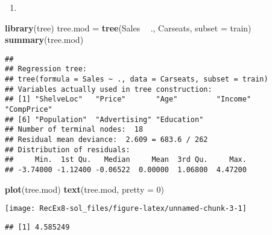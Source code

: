 \documentclass[]{article}
\newenvironment{Shaded}{\begin{snugshade}}{\end{snugshade}}
\newcommand{\DataTypeTok}[1]{\textcolor[rgb]{0.13,0.29,0.53}{#1}}
\newcommand{\DecValTok}[1]{\textcolor[rgb]{0.00,0.00,0.81}{#1}}
\newcommand{\KeywordTok}[1]{\textcolor[rgb]{0.13,0.29,0.53}{\textbf{#1}}}
\newcommand{\NormalTok}[1]{#1}
\newcommand{\OperatorTok}[1]{\textcolor[rgb]{0.81,0.36,0.00}{\textbf{#1}}}
\newcommand{\StringTok}[1]{\textcolor[rgb]{0.31,0.60,0.02}{#1}}
\begin{document}
\begin{enumerate}
\def\labelenumi{\alph{enumi})}
\setcounter{enumi}{1}
\item
\end{enumerate}

\begin{Shaded}
\begin{Highlighting}[]
\KeywordTok{library}\NormalTok{(tree)}
\NormalTok{tree.mod =}\StringTok{ }\KeywordTok{tree}\NormalTok{(Sales }\OperatorTok{~}\StringTok{ }\NormalTok{., Carseats, }\DataTypeTok{subset =}\NormalTok{ train)}
\KeywordTok{summary}\NormalTok{(tree.mod)}
\end{Highlighting}
\end{Shaded}

\begin{verbatim}
## 
## Regression tree:
## tree(formula = Sales ~ ., data = Carseats, subset = train)
## Variables actually used in tree construction:
## [1] "ShelveLoc"   "Price"       "Age"         "Income"      "CompPrice"  
## [6] "Population"  "Advertising" "Education"  
## Number of terminal nodes:  18 
## Residual mean deviance:  2.609 = 683.6 / 262 
## Distribution of residuals:
##     Min.  1st Qu.   Median     Mean  3rd Qu.     Max. 
## -3.74000 -1.12400 -0.06522  0.00000  1.06800  4.47200
\end{verbatim}

\begin{Shaded}
\begin{Highlighting}[]
\KeywordTok{plot}\NormalTok{(tree.mod)}
\KeywordTok{text}\NormalTok{(tree.mod, }\DataTypeTok{pretty =} \DecValTok{0}\NormalTok{)}
\end{Highlighting}
\end{Shaded}

\texttt{[image: RecEx8-sol\_files/figure-latex/unnamed-chunk-3-1]}

\begin{Shaded}
\end{Shaded}

\begin{verbatim}
## [1] 4.585249
\end{verbatim}
\end{document}
